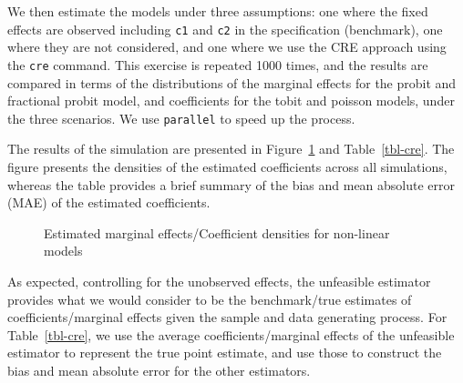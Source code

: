 \documentclass[bib]{statapress}
\begin{document}
We then estimate the models under three assumptions: one where the fixed
effects are observed including \texttt{c1} and \texttt{c2} in the
specification (benchmark), one where they are not considered, and one
where we use the CRE approach using the \texttt{cre} command. This
exercise is repeated 1000 times, and the results are compared in terms
of the distributions of the marginal effects for the probit and
fractional probit model, and coefficients for the tobit and poisson
models, under the three scenarios. We use
\texttt{parallel}\citep{vegayon2019} to speed up the process.

The results of the simulation are presented in Figure~\ref{fig-cre} and
Table~\ref{tbl-cre}. The figure presents the densities of the estimated
coefficients across all simulations, whereas the table provides a brief
summary of the bias and mean absolute error (MAE) of the estimated
coefficients.

\begin{figure}[H]


\caption{\label{fig-cre}Estimated marginal effects/Coefficient densities
for non-linear models}

\end{figure}%

As expected, controlling for the unobserved effects, the unfeasible
estimator provides what we would consider to be the benchmark/true
estimates of coefficients/marginal effects given the sample and data
generating process. For Table~\ref{tbl-cre}, we use the average
coefficients/marginal effects of the unfeasible estimator to represent
the true point estimate, and use those to construct the bias and mean
absolute error for the other estimators.
\end{document}
